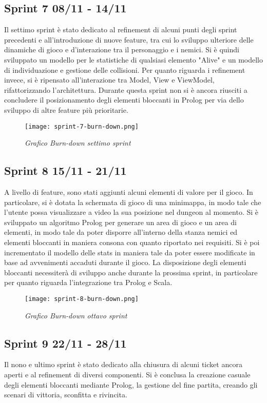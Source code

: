\subsection{Sprint 7 08/11 - 14/11}
Il settimo sprint è stato dedicato al refinement di alcuni punti degli sprint precedenti e all'introduzione di nuove feature, tra cui lo sviluppo ulteriore delle dinamiche di gioco e d'interazione tra il personaggio e i nemici. 
Si è quindi sviluppato un modello per le statistiche di qualsiasi elemento "Alive" e un modello di individuazione e gestione delle collisioni. 
Per quanto riguarda i refinement invece, si è ripensato all'interazione tra Model, View e ViewModel, rifattorizzando l'architettura. 
Durante questa sprint non si è ancora riusciti a concludere il posizionamento degli elementi bloccanti in Prolog per via dello sviluppo di altre feature più prioritarie.
\begin{figure}[!hbt]
    \centering
    \texttt{[image: sprint-7-burn-down.png]}
    \caption{\textit{Grafico Burn-down settimo sprint}} 
\end{figure}


\subsection{Sprint 8 15/11 - 21/11}
A livello di feature, sono stati aggiunti alcuni elementi di valore per il gioco. 
In particolare, si è dotata la schermata di gioco di una minimappa, in modo tale che l'utente possa visualizzare a video la sua posizione nel dungeon al momento. 
Si è sviluppato un algoritmo Prolog per generare un area di gioco e un area di elementi, 
in modo tale da poter disporre all'interno della stanza nemici ed elementi bloccanti in maniera consona con quanto riportato nei requisiti.
Si è poi incrementato il modello delle stats in maniera tale da poter essere modificate in base ad avvenimenti accaduti durante il gioco. 
La disposizione degli elementi bloccanti necessiterà di sviluppo anche durante la prossima sprint, in particolare per quanto riguarda l'integrazione tra Prolog e Scala. 
\begin{figure}[!hbt]
    \centering
    \texttt{[image: sprint-8-burn-down.png]}
    \caption{\textit{Grafico Burn-down ottavo sprint}} 
\end{figure}

\subsection{Sprint 9 22/11 - 28/11}
Il nono e ultimo sprint è stato dedicato alla chiusura di alcuni ticket ancora aperti e al refinement di diversi componenti. 
Si è conclusa la creazione casuale degli elementi bloccanti mediante Prolog, la gestione del fine partita, creando gli scenari di vittoria, sconfitta e rivincita.

